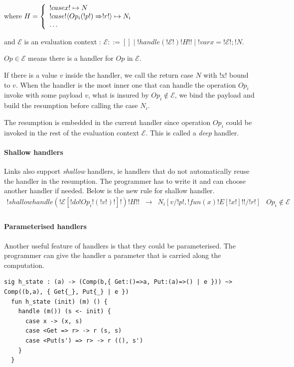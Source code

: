 \documentclass[10pt, nonacm=true, language=french, language=english]{acmart}
\begin{document}
where $H =
\left\{\begin{array}{l}
  !case x! \mapsto N \\
  !case ! \langle Op_{i}(!p!) \Rightarrow !r!\rangle \mapsto N_{i} \\
  \dots \\
\end{array}\right.$

and $\mathcal E$ is an evaluation context : $\mathcal E ::= [] \mid !handle ( !\mathcal E! ) { !H! } ! \mid !var x = ! \mathcal E ! ; ! N$.

$Op \in \mathcal E$ means there is a handler for $Op$ in $\mathcal E$.

If there is a value $v$ inside the handler, we call the return case $N$ with !x! bound to $v$. When the handler is the most inner one that can handle the operation $Op_{i}$ invoke with some payload $v$, what is insured by $Op_{i}\notin \mathcal E$, we bind the payload and build the resumption before calling the case $N_{i}$.

The resumption is embedded in the current handler since operation $Op_{i}$ could be invoked in the rest of the evaluation context $\mathcal E$. This is called a \emph{deep} handler.

\paragraph{Shallow handlers}
Links also support \emph{shallow} handlers, ie handlers that do not automatically reuse the handler in the resumption. The programmer has to write it and can choose another handler if needed. Below is the new rule for shallow handler.
\[
  \begin{array}{rcll}
    !shallowhandle ( !\mathcal E[!do !Op_{i}!( !v! )!]! ) { !H! }! & \longrightarrow & N_{i}[v/!p!, !fun (x)  { ! E[!x!] ! }!/!r!] & Op_{i} \notin \mathcal E\\
  \end{array}
\]

\paragraph{Parameterised handlers}

Another useful feature of handlers is that they could be parameterised. The programmer can give the handler a parameter that is carried along the computation.

\begin{lstlisting}[caption=Example of parameterised handler]
  sig h_state : (a) -> (Comp(b,{ Get:()=>a, Put:(a)=>() | e })) ~> Comp((b,a), { Get{_}, Put{_} | e })
  fun h_state (init) (m) () {
    handle (m()) (s <- init) {
      case x -> (x, s)
      case <Get => r> -> r (s, s)
      case <Put(s') => r> -> r ((), s')
    }
  }
\end{lstlisting}
\end{document}
